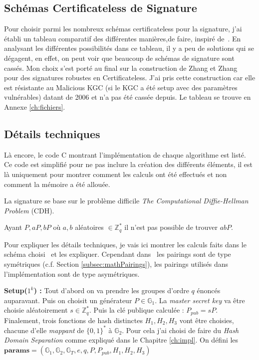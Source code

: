 \subsection{Schémas Certificateless de Signature}
Pour choisir parmi les nombreux schémas certificateless pour la signature, j'ai établi un tableau comparatif des différentes manières,de faire, inspiré de~\cite{bookIntroCertificateless}. En analysant les différentes possibilités dans ce tableau, il y a peu de solutions qui se dégagent, en effet, on peut voir que beaucoup de schémas de signature sont cassés. Mon choix s'est porté au final sur la construction de Zhang et Zhang~\cite{conf/acns/ZhangWXF06} pour des signatures robustes en Certificateless. J'ai pris cette construction car elle est résistante au Malicious KGC (si le KGC a été setup avec des paramètres vulnérables) datant de 2006 et n'a pas été cassée depuis. Le tableau se trouve en Annexe \ref{ch:fichiers}.
\subsection{Détails techniques}
Là encore, le code C montrant l'implémentation de chaque algorithme est listé. Ce code est simplifié pour ne pas inclure la création des différents éléments, il est là uniquement pour montrer comment les calculs ont été effectués et non comment la mémoire a été allouée.
 
La signature se base sur le problème difficile \textit{The Computational Diffie-Hellman Problem} (CDH). 

Ayant $P, aP, bP$ où $a,b$ aléatoires $\in \mathbb{Z}_q^*$ il n'est pas possible de trouver $abP$.

Pour expliquer les détails techniques, je vais ici montrer les calculs faits dans le schéma choisi~\cite{conf/acns/ZhangWXF06} et les expliquer. Cependant dans~\cite{conf/acns/ZhangWXF06} les pairings sont de type symétriques (c.f. Section \ref{subsec:mathPairings}), les pairings utilisés dans l'implémentation sont de type asymétriques.

\textbf{Setup($1^k $) :} Tout d'abord on va prendre les groupes d'ordre $q$ énoncés auparavant. Puis on choisit un générateur $P \in \mathbb{G}_1$. La \textit{master secret key} va être choisie aléatoirement $s \in \mathbb{Z}_q^*$. Puis la clé publique calculée : $P_{pub} = sP$. Finalement, trois fonctions de hash distinctes $H_1, H_2, H_3$ vont être choisies, chacune d'elle \textit{mappant} de $\{0,1\}^*$ à $\mathbb{G}_2$. Pour cela j'ai choisi de faire du \textit{Hash Domain Separation} comme expliqué dans le Chapitre \ref{ch:impl}. On défini les $\mathbf{params} = (\mathbb{G}_1,\mathbb{G}_2,\mathbb{G}_T,e,q,P,P_{pub},H_1,H_2,H_3)$

